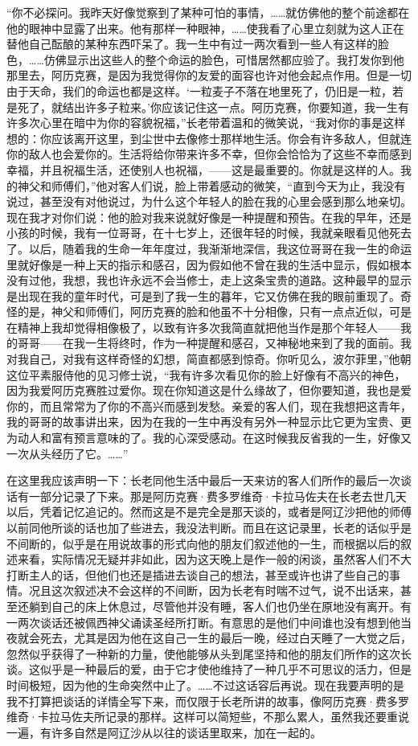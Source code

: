\par “你不必探问。我昨天好像觉察到了某种可怕的事情，……就仿佛他的整个前途都在他的眼神中显露了出来。他有那样一种眼神，……使我看了心里立刻就为这人正在替他自己酝酿的某种东西吓呆了。我一生中有过一两次看到一些人有这样的脸色，……仿佛显示出这些人的整个命运的脸色，可惜居然都应验了。我打发你到他那里去，阿历克赛，是因为我觉得你的友爱的面容也许对他会起点作用。但是一切由于天命，我们的命运也都是这样。‘一粒麦子不落在地里死了，仍旧是一粒，若是死了，就结出许多子粒来。’你应该记住这一点。阿历克赛，你要知道，我一生有许多次心里在暗中为你的容貌祝福，”长老带着温和的微笑说，“我对你的事是这样想的：你应该离开这里，到尘世中去像修士那样地生活。你会有许多敌人，但就连你的敌人也会爱你的。生活将给你带来许多不幸，但你会恰恰为了这些不幸而感到幸福，并且祝福生活，还使别人也祝福，——这是最重要的。你就是这样的人。我的神父和师傅们，”他对客人们说，脸上带着感动的微笑，“直到今天为止，我没有说过，甚至没有对他说过，为什么这个年轻人的脸在我的心里会感到那么地亲切。现在我才对你们说：他的脸对我来说就好像是一种提醒和预告。在我的早年，还是小孩的时候，我有一位哥哥，在十七岁上，还很年轻的时候，我就亲眼看见他死去了。以后，随着我的生命一年年度过，我渐渐地深信，我这位哥哥在我一生的命运里就好像是一种上天的指示和感召，因为假如他不曾在我的生活中显示，假如根本没有过他，我想，我也许永远不会当修士，走上这条宝贵的道路。这种最早的显示是出现在我的童年时代，可是到了我一生的暮年，它又仿佛在我的眼前重现了。奇怪的是，神父和师傅们，阿历克赛的脸和他虽不十分相像，只有一点点近似，可是在精神上我却觉得相像极了，以致有许多次我简直就把他当作是那个年轻人——我的哥哥——在我一生将终时，作为一种提醒和感召，又神秘地来到了我的面前。我对我自己，对我有这样奇怪的幻想，简直都感到惊奇。你听见么，波尔菲里，”他朝这位平素服侍他的见习修士说，“我有许多次看见你的脸上好像有不高兴的神色，因为我爱阿历克赛胜过爱你。现在你知道这是什么缘故了，但你要知道，我也是爱你的，而且常常为了你的不高兴而感到发愁。亲爱的客人们，现在我想把这青年，我的哥哥的故事讲出来，因为在我的一生中再没有另外一种显示比它更为宝贵、更为动人和富有预言意味的了。我的心深受感动。在这时候我反省我的一生，好像又一次从头经历了它。……”
\par 在这里我应该声明一下：长老同他生活中最后一天来访的客人们所作的最后一次谈话有一部分记录了下来。那是阿历克赛·费多罗维奇·卡拉马佐夫在长老去世几天以后，凭着记忆追记的。然而这是不是完全是那天谈的，或者是阿辽沙把他的师傅以前同他所谈的话也加了些进去，我没法判断。而且在这记录里，长老的话似乎是不间断的，似乎是在用说故事的形式向他的朋友们叙述他的一生，而根据以后的叙述来看，实际情况无疑并非如此，因为这天晚上是作一般的闲谈，虽然客人们不大打断主人的话，但他们也还是插进去谈自己的想法，甚至或许也讲了些自己的事情。况且这次叙述决不会这样的不间断，因为长老有时喘不过气，说不出话来，甚至还躺到自己的床上休息过，尽管他并没有睡，客人们也仍坐在原地没有离开。有一两次谈话还被佩西神父诵读圣经所打断。有意思的是他们中间谁也没有想到他当夜就会死去，尤其是因为他在这自己一生的最后一晚，经过白天睡了一大觉之后，忽然似乎获得了一种新的力量，使他能够从头到尾坚持和他的朋友们所作的这次长谈。这似乎是一种最后的爱，由于它才使他维持了一种几乎不可思议的活力，但是时间极短，因为他的生命突然中止了。……不过这话容后再说。现在我要声明的是我不打算把谈话的详情全写下来，而仅限于长老所讲的故事，像阿历克赛·费多罗维奇·卡拉马佐夫所记录的那样。这样可以简短些，不那么累人，虽然我还要重说一遍，有许多自然是阿辽沙从以往的谈话里取来，加在一起的。
